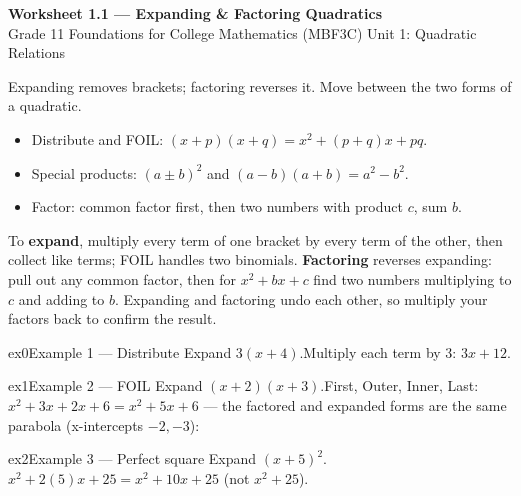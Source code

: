 \documentclass[11pt]{article}
\begin{document}
\begin{center}
{\LARGE\bfseries\color{titleblue}Worksheet 1.1 --- Expanding \& Factoring Quadratics}\\[2pt]
{\small Grade 11 Foundations for College Mathematics (MBF3C) \textperiodcentered{} Unit 1: Quadratic Relations}
\end{center}

\begin{ideabox}
Expanding removes brackets; factoring reverses it. Move between the two forms of a quadratic.
\begin{itemize}[leftmargin=*,itemsep=2pt]
  \item Distribute and FOIL: $(x+p)(x+q)=x^2+(p+q)x+pq$.
  \item Special products: $(a\pm b)^2$ and $(a-b)(a+b)=a^2-b^2$.
  \item Factor: common factor first, then two numbers with product $c$, sum $b$.
\end{itemize}
\end{ideabox}

\begin{learnbox}
To \textbf{expand}, multiply every term of one bracket by every term of the other, then collect like terms; FOIL handles two binomials.
\textbf{Factoring} reverses expanding: pull out any common factor, then for $x^2+bx+c$ find two numbers multiplying to $c$ and adding to $b$.
Expanding and factoring undo each other, so multiply your factors back to confirm the result.
\end{learnbox}


\begin{example}{ex0}{Example 1 --- Distribute}
Expand $3(x+4)$.\soln Multiply each term by 3: $3x+12$.
\end{example}

\begin{example}{ex1}{Example 2 --- FOIL}
Expand $(x+2)(x+3)$.\soln First, Outer, Inner, Last: $x^2+3x+2x+6=x^2+5x+6$ — the factored and expanded forms are the same parabola (x-intercepts $-2,-3$):
\end{example}

\begin{example}{ex2}{Example 3 --- Perfect square}
Expand $(x+5)^2$.\soln $x^2+2(5)x+25=x^2+10x+25$ (not $x^2+25$).
\end{example}
\end{document}
